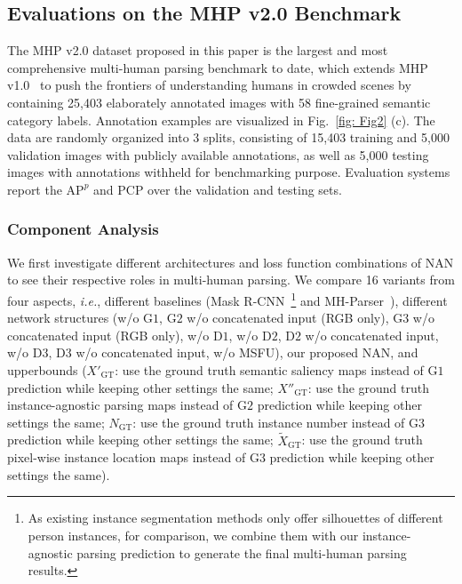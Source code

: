 \documentclass[10pt,twocolumn,letterpaper]{article}
\theoremstyle{definition}
\theoremstyle{remark}
\begin{document}
\subsection{Evaluations on the MHP v2.0 Benchmark}

The MHP v2.0 dataset proposed in this paper is the largest and most comprehensive multi-human parsing benchmark to date, which extends MHP v1.0~\cite{li2017towards} to push the frontiers of understanding humans in crowded scenes by containing 25{,}403 elaborately annotated images with 58 fine-grained semantic category labels. Annotation examples are visualized in Fig.~\ref{fig: Fig2} (c). The data are randomly organized into 3 splits, consisting of 15{,}403 training and 5{,}000 validation images with publicly available annotations, as well as 5{,}000 testing images with annotations withheld for benchmarking purpose. Evaluation systems report the $\mathrm{AP}^{p}$ and PCP over the validation and testing sets.

\vspace{-2mm}
\subsubsection{Component Analysis}

We first investigate different architectures and loss function combinations of NAN to see their respective roles in multi-human parsing. We compare 16 variants from four aspects, \emph{i.e.}, different baselines (Mask R-CNN~\cite{he2017mask}\footnote{As existing instance segmentation methods only offer silhouettes of different person instances, for comparison, we combine them with our instance-agnostic parsing prediction to generate the final multi-human parsing results.} and MH-Parser~\cite{li2017towards}), different network structures (w/o $\mathrm{G1}$, $\mathrm{G2}$ w/o concatenated input (RGB only), $\mathrm{G3}$ w/o concatenated input (RGB only), w/o $\mathrm{D1}$, w/o $\mathrm{D2}$, $\mathrm{D2}$ w/o concatenated input, w/o $\mathrm{D3}$, $\mathrm{D3}$ w/o concatenated input, w/o MSFU), our proposed NAN, and upperbounds ($X{'}_\mathrm{GT}$: use the ground truth semantic saliency maps instead of $\mathrm{G1}$ prediction while keeping other settings the same; $X{''}_\mathrm{GT}$: use the ground truth instance-agnostic parsing maps instead of $\mathrm{G2}$ prediction while keeping other settings the same; $N_\mathrm{GT}$: use the ground truth instance number instead of $\mathrm{G3}$ prediction while keeping other settings the same; $\tilde{X}_\mathrm{GT}$: use the ground truth pixel-wise instance location maps instead of $\mathrm{G3}$ prediction while keeping other settings the same).
\end{document}
